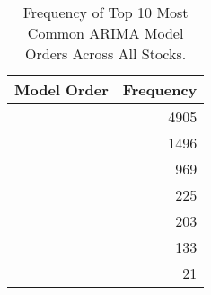 \begin{table}
\caption{Frequency of Top 10 Most Common ARIMA Model Orders Across All Stocks.}
\label{tab:arima_orders}
\begin{tabular}{lr}
\toprule
Model Order & Frequency \\
\midrule
[0 0 0] & 4905 \\
[0 0 1] & 1496 \\
[1 0 0] & 969 \\
[2 0 0] & 225 \\
[1 0 1] & 203 \\
[0 0 2] & 133 \\
[2 0 1] & 21 \\
\bottomrule
\end{tabular}
\end{table}
